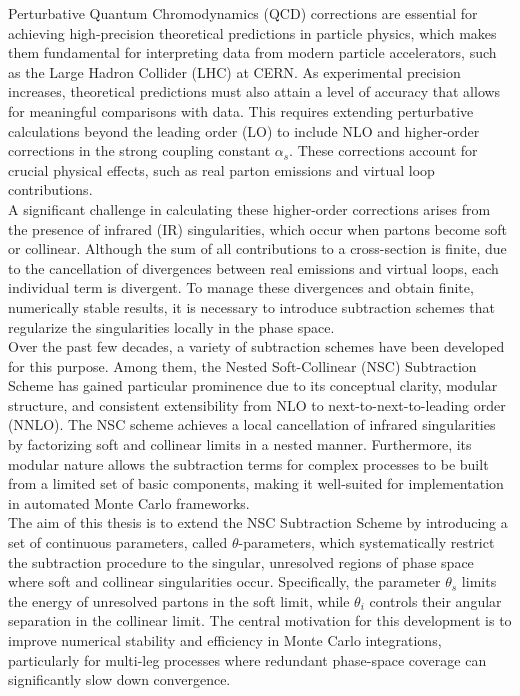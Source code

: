 Perturbative Quantum Chromodynamics (QCD) corrections are essential for achieving high-precision theoretical predictions in particle physics, which makes them fundamental for interpreting data from modern particle accelerators, such as the Large Hadron Collider (LHC) at CERN. As experimental precision increases, theoretical predictions must also attain a level of accuracy that allows for meaningful comparisons with data. This requires extending perturbative calculations beyond the leading order (LO) to include NLO and higher-order corrections in the strong coupling constant $\alpha_s$. These corrections account for crucial physical effects, such as real parton emissions and virtual loop contributions. \\
A significant challenge in calculating these higher-order corrections arises from the presence of infrared (IR) singularities, which occur when partons become soft or collinear. Although the sum of all contributions to a cross-section is finite, due to the cancellation of divergences between real emissions and virtual loops, each individual term is divergent. To manage these divergences and obtain finite, numerically stable results, it is necessary to introduce subtraction schemes that regularize the singularities locally in the phase space. \\
Over the past few decades, a variety of subtraction schemes have been developed for this purpose. Among them, the Nested Soft-Collinear (NSC) Subtraction Scheme has gained particular prominence due to its conceptual clarity, modular structure, and consistent extensibility from NLO to next-to-next-to-leading order (NNLO). The NSC scheme achieves a local cancellation of infrared singularities by factorizing soft and collinear limits in a nested manner. Furthermore, its modular nature allows the subtraction terms for complex processes to be built from a limited set of basic components, making it well-suited for implementation in automated Monte Carlo frameworks. \\
The aim of this thesis is to extend the NSC Subtraction Scheme by introducing a set of continuous parameters, called $\theta$-parameters, which systematically restrict the subtraction procedure to the singular, unresolved regions of phase space where soft and collinear singularities occur. Specifically, the parameter $\theta_s$ limits the energy of unresolved partons in the soft limit, while $\theta_i$ controls their angular separation in the collinear limit. The central motivation for this development is to improve numerical stability and efficiency in Monte Carlo integrations, particularly for multi-leg processes where redundant phase-space coverage can significantly slow down convergence. \\
